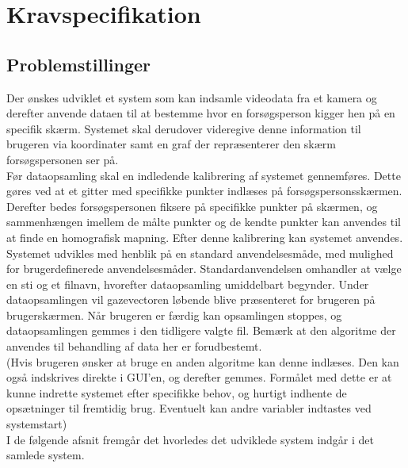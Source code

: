 \documentclass[rapport.tex]{subfiles}
\begin{document}
\section{Kravspecifikation}

	\subsection{Problemstillinger}
	Der ønskes udviklet et system som kan indsamle videodata fra et kamera og derefter anvende dataen til
	at bestemme hvor en forsøgsperson kigger hen på en specifik skærm. Systemet skal derudover videregive
	denne information til brugeren via koordinater samt en graf der repræsenterer den skærm forsøgspersonen
	ser på.
	\\
	\indent
	Før dataopsamling skal en indledende kalibrering af systemet gennemføres. Dette gøres ved at et gitter med
	specifikke punkter indlæses på forsøgspersonsskærmen. Derefter bedes forsøgspersonen fiksere på specifikke punkter
	på skærmen, og sammenhængen imellem de målte punkter og de kendte punkter kan anvendes til at finde en
	homografisk mapning. Efter denne kalibrering kan systemet anvendes.
	\\
	\indent
	Systemet udvikles med henblik på en standard anvendelsesmåde, med mulighed for brugerdefinerede anvendelsesmåder. 
	Standardanvendelsen omhandler at vælge en sti og et filnavn, hvorefter dataopsamling umiddelbart begynder.
	Under dataopsamlingen vil gazevectoren løbende blive præsenteret for brugeren på brugerskærmen. Når brugeren er 
	færdig kan opsamlingen stoppes, og dataopsamlingen gemmes i den tidligere valgte fil. Bemærk at den algoritme
	der anvendes til behandling af data her er forudbestemt.
	\\
	(Hvis brugeren ønsker at bruge en anden algoritme kan denne indlæses. Den kan også indskrives direkte i
	GUI'en, og derefter gemmes. Formålet med dette er at kunne indrette systemet efter specifikke behov, og
	hurtigt indhente de opsætninger til fremtidig brug. Eventuelt kan andre variabler indtastes ved systemstart) 
	\\
	\indent
	I de følgende afsnit fremgår det hvorledes det udviklede system indgår i det samlede system.
	
	
\end{document}
